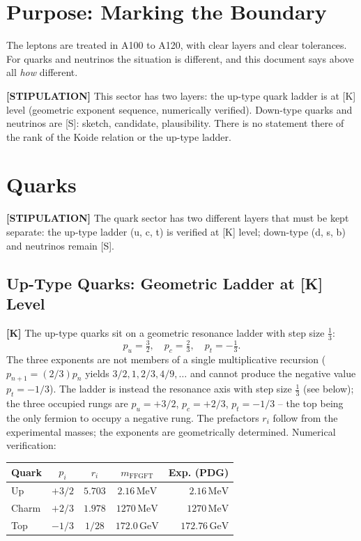\section{Purpose: Marking the Boundary}

The leptons are treated in A100 to A120, with clear layers and clear tolerances.
For quarks and neutrinos the situation is different, and this document says above
all \emph{how} different.

\textbf{[STIPULATION]} This sector has two layers: the up-type quark ladder is at
[K] level (geometric exponent sequence, numerically verified). Down-type quarks
and neutrinos are [S]: sketch, candidate, plausibility. There is no statement
there of the rank of the Koide relation or the up-type ladder.

\section{Quarks}

\textbf{[STIPULATION]} The quark sector has two different layers that must be kept
separate: the up-type ladder (u, c, t) is verified at [K] level; down-type (d, s, b)
and neutrinos remain [S].

\subsection{Up-Type Quarks: Geometric Ladder at [K] Level}

\textbf{[K]} The up-type quarks sit on a geometric resonance ladder with step
size $\tfrac13$:
\[
  p_u = \tfrac32,\quad p_c = \tfrac23,\quad p_t = -\tfrac13.
\]
The three exponents are not members of a single multiplicative recursion
($p_{n+1}=(2/3)p_n$ yields $3/2,1,2/3,4/9,\ldots$ and cannot produce the
negative value $p_t=-1/3$). The ladder is instead the resonance axis with
step size $\tfrac13$ (see below); the three occupied rungs are
$p_u=+3/2$, $p_c=+2/3$, $p_t=-1/3$ -- the top being the only fermion
to occupy a negative rung. The prefactors $r_i$ follow from the experimental
masses; the exponents are geometrically determined. Numerical verification:

\begin{center}
\renewcommand{\arraystretch}{1.3}
{\small\begin{tabular}{lcccr}
\toprule
Quark & $p_i$ & $r_i$ & $m_\text{FFGFT}$ & Exp. (PDG) \\
\midrule
Up    & $+3/2$ & $5{.}703$ & $2{.}16\,\text{MeV}$    & $2{.}16\,\text{MeV}$ \\
Charm & $+2/3$ & $1{.}978$ & $1270\,\text{MeV}$      & $1270\,\text{MeV}$ \\
Top   & $-1/3$ & $1/28$    & $172{.}0\,\text{GeV}$   & $172{.}76\,\text{GeV}$ \\
\bottomrule
\end{tabular}}
\renewcommand{\arraystretch}{1.0}
\end{center}

